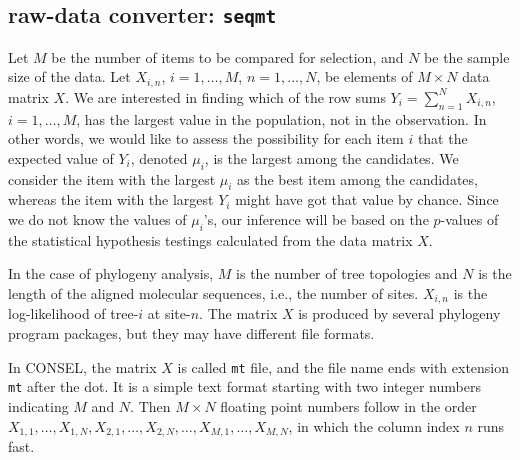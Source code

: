 \documentclass[12pt]{article}
\begin{document}
\subsection{raw-data converter: {\tt seqmt}}

Let $M$ be the number of items to be compared for selection, and $N$ be
the sample size of the data. Let $X_{i,n}$, $i=1,\ldots,M$,
$n=1,\ldots,N$, be elements of $M\times N$ data matrix $X$. We are
interested in finding which of the row sums $Y_i = \sum_{n=1}^N
X_{i,n}$, $i=1,\ldots,M$, has the largest value in the population, not
in the observation. In other words, we would like to assess the
possibility for each item $i$ that the expected value of $Y_i$, denoted
$\mu_i$, is the largest among the candidates.  We consider the item with
the largest $\mu_i$ as the best item among the candidates, whereas the
item with the largest $Y_i$ might have got that value by chance. Since
we do not know the values of $\mu_i$'s, our inference will be based on
the $p$-values of the statistical hypothesis testings calculated from
the data matrix $X$.


In the case of phylogeny analysis, $M$ is the number of tree topologies
and $N$ is the length of the aligned molecular sequences, i.e., the
number of sites. $X_{i,n}$ is the log-likelihood of tree-$i$ at
site-$n$. The matrix $X$ is produced by several phylogeny program
packages, but they may have different file formats.

In CONSEL, the matrix $X$ is called {\tt mt} file, and the file name
ends with extension {\tt mt} after the dot. It is a simple text format
starting with two integer numbers indicating $M$ and $N$. Then $M \times
N$ floating point numbers follow in the order $X_{1,1}, \ldots, X_{1,N},
X_{2,1},\ldots,X_{2,N},\ldots, X_{M,1},\ldots,X_{M,N}$, in which the
column index $n$ runs fast.
\end{document}
